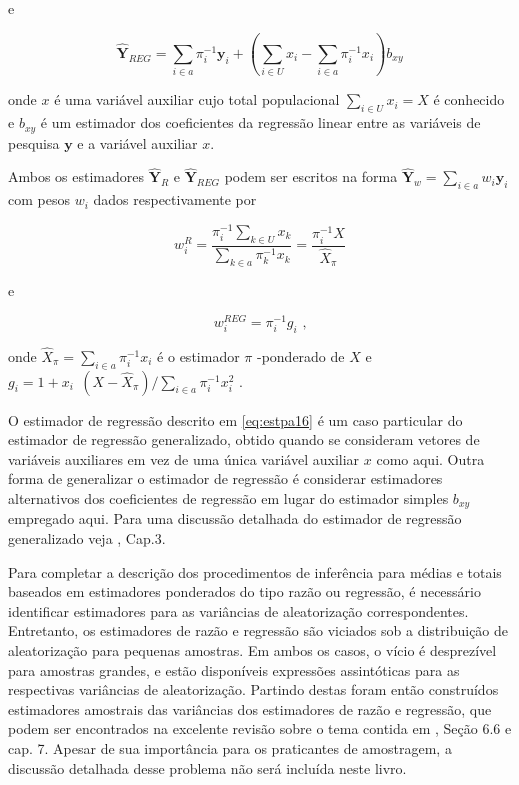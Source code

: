 \documentclass[]{book}
\numberwithin{example}{chapter}
\numberwithin{remark}{chapter}
\numberwithin{definition}{chapter}
\begin{document}
e

\begin{equation}
\mathbf{\hat{Y}}_{REG} = \sum\limits_{i \in a} {\pi_i^{-1}} \mathbf{y}_i + \left( \sum\limits_{i \in U} x_i - \sum\limits_{i \in a} {\pi_i^{-1}} x_i \right) b_{xy}  \label{eq:estpa16}
\end{equation}

onde \(x\) é uma variável auxiliar cujo total populacional
\(\sum_{i \in U} x_i = X\) é conhecido e \(b_{xy}\) é um estimador dos
coeficientes da regressão linear entre as variáveis de pesquisa
\(\mathbf{y}\) e a variável auxiliar \(x\).

Ambos os estimadores \(\mathbf{\hat{Y}}_R\) e \(\mathbf{\hat{Y}}_{REG}\)
podem ser escritos na forma
\(\mathbf{\hat{Y}}_w = \sum\limits_{i \in a} w_i \mathbf{y}_i\) com
pesos \(w_i\) dados respectivamente por

\begin{equation}
w_i^R = \frac{\pi_i^{-1} \sum_{k \in U} x_k} {\sum\limits_{k \in a} \pi_k^{-1} x_k} = \frac{\pi_i^{-1} X} {\widehat{X}_{\pi}} \label{eq:estpa17} 
\end{equation}

e

\begin{equation}
w_i^{REG} = \pi_i^{-1} g_i \mbox{ ,} \label{eq:estpa18}
\end{equation}

onde \(\widehat{X}_{\pi} = \sum\limits_{i \in a} \pi_i^{-1} x_i\) é o
estimador \(\pi\) -ponderado de \(X\) e
\(g_{i} = 1 + x_{i \mbox{ }} (X - \widehat{X}_{\pi}) / \sum_{i \in a} \pi_i^{-1} x_i^2\)
.

O estimador de regressão descrito em \eqref{eq:estpa16} é um caso
particular do estimador de regressão generalizado, obtido quando se
consideram vetores de variáveis auxiliares em vez de uma única variável
auxiliar \(x\) como aqui. Outra forma de generalizar o estimador de
regressão é considerar estimadores alternativos dos coeficientes de
regressão em lugar do estimador simples \(b_{xy}\) empregado aqui. Para
uma discussão detalhada do estimador de regressão generalizado veja
\citep{Silva}, Cap.3.

Para completar a descrição dos procedimentos de inferência para médias e
totais baseados em estimadores ponderados do tipo razão ou regressão, é
necessário identificar estimadores para as variâncias de aleatorização
correspondentes. Entretanto, os estimadores de razão e regressão são
viciados sob a distribuição de aleatorização para pequenas amostras. Em
ambos os casos, o vício é desprezível para amostras grandes, e estão
disponíveis expressões assintóticas para as respectivas variâncias de
aleatorização. Partindo destas foram então construídos estimadores
amostrais das variâncias dos estimadores de razão e regressão, que podem
ser encontrados na excelente revisão sobre o tema contida em
\citep{SSW92}, Seção 6.6 e cap. 7. Apesar de sua importância para os
praticantes de amostragem, a discussão detalhada desse problema não será
incluída neste livro.
\end{document}
